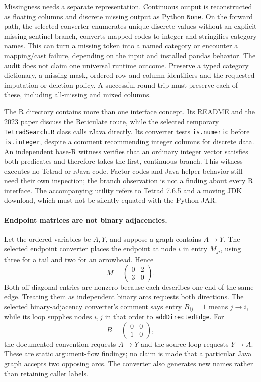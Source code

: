 Missingness needs a separate representation. Continuous output is reconstructed
as floating columns and discrete missing output as Python \texttt{None}. On
the forward path, the selected converter enumerates unique discrete values
without an explicit missing-sentinel branch, converts mapped codes to integer
and stringifies category names. This can turn a missing token into a named
category or encounter a mapping/cast failure, depending on the input and
installed pandas behavior. The audit does not claim one universal runtime
outcome. Preserve a typed category dictionary, a missing mask, ordered row and
column identifiers and the requested imputation or deletion policy. A successful
round trip must preserve each of these, including all-missing and mixed columns.
\citep{exec24_pytetrad_source}

The R directory contains more than one interface concept. Its README and the
2023 paper discuss the Reticulate route, while the selected temporary
\texttt{TetradSearch.R} class calls rJava directly. Its converter tests
\texttt{is.numeric} before \texttt{is.integer}, despite a comment recommending
integer columns for discrete data. An independent base-R witness verifies that
an ordinary integer vector satisfies both predicates and therefore takes the
first, continuous branch. This witness executes no Tetrad or rJava code.
Factor codes and Java helper behavior still need their own inspection; the
branch observation is not a finding about every R interface. The accompanying
utility refers to Tetrad 7.6.5 and a moving JDK download, which must not be
silently equated with the Python JAR.~\citep{exec24_pytetrad_source,exec24_pytetrad_choice}

\paragraph{Endpoint matrices are not binary adjacencies.}
Let the ordered variables be $A,Y$, and suppose a graph contains $A\to Y$.
The selected endpoint converter places the endpoint at node $i$ in entry
$M_{ji}$, using three for a tail and two for an arrowhead. Hence
\[
 M=\begin{pmatrix}0&2\\3&0\end{pmatrix}.
\]
Both off-diagonal entries are nonzero because each describes one end of the
same edge. Treating them as independent binary arcs requests both directions.
The selected binary-adjacency converter's comment says entry $B_{ij}=1$
means $j\to i$, while its loop supplies nodes $i,j$ in that order to
\texttt{addDirectedEdge}. For
\[
 B=\begin{pmatrix}0&0\\1&0\end{pmatrix},
\]
the documented convention requests $A\to Y$ and the source loop requests
$Y\to A$. These are static argument-flow findings; no claim is made that a
particular Java graph accepts two opposing arcs. The converter also generates
new names rather than retaining caller labels.~\citep{exec24_pytetrad_source,exec24_pytetrad_choice}

